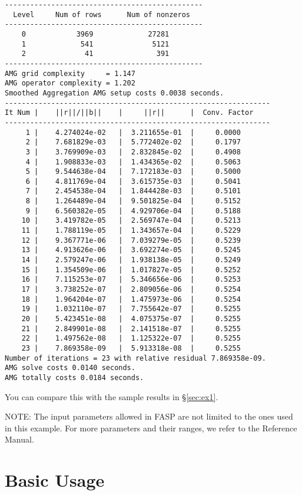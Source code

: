 \documentclass[11pt]{memoir}
\begin{document}
\begin{lstlisting}[numbers=none]
-----------------------------------------------
  Level     Num of rows      Num of nonzeros
-----------------------------------------------
    0            3969             27281
    1             541              5121
    2              41               391
-----------------------------------------------
AMG grid complexity     = 1.147
AMG operator complexity = 1.202
Smoothed Aggregation AMG setup costs 0.0038 seconds.
---------------------------------------------------------------
It Num |    ||r||/||b||    |     ||r||      |  Conv. Factor
---------------------------------------------------------------
     1 |    4.274024e-02   |  3.211655e-01  |     0.0000
     2 |    7.681829e-03   |  5.772402e-02  |     0.1797
     3 |    3.769909e-03   |  2.832845e-02  |     0.4908
     4 |    1.908833e-03   |  1.434365e-02  |     0.5063
     5 |    9.544638e-04   |  7.172183e-03  |     0.5000
     6 |    4.811769e-04   |  3.615735e-03  |     0.5041
     7 |    2.454538e-04   |  1.844428e-03  |     0.5101
     8 |    1.264489e-04   |  9.501825e-04  |     0.5152
     9 |    6.560382e-05   |  4.929706e-04  |     0.5188
    10 |    3.419782e-05   |  2.569747e-04  |     0.5213
    11 |    1.788119e-05   |  1.343657e-04  |     0.5229
    12 |    9.367771e-06   |  7.039279e-05  |     0.5239
    13 |    4.913626e-06   |  3.692274e-05  |     0.5245
    14 |    2.579247e-06   |  1.938138e-05  |     0.5249
    15 |    1.354509e-06   |  1.017827e-05  |     0.5252
    16 |    7.115253e-07   |  5.346656e-06  |     0.5253
    17 |    3.738252e-07   |  2.809056e-06  |     0.5254
    18 |    1.964204e-07   |  1.475973e-06  |     0.5254
    19 |    1.032110e-07   |  7.755642e-07  |     0.5255
    20 |    5.423451e-08   |  4.075375e-07  |     0.5255
    21 |    2.849901e-08   |  2.141518e-07  |     0.5255
    22 |    1.497562e-08   |  1.125322e-07  |     0.5255
    23 |    7.869358e-09   |  5.913318e-08  |     0.5255
Number of iterations = 23 with relative residual 7.869358e-09.
AMG solve costs 0.0140 seconds.
AMG totally costs 0.0184 seconds.
\end{lstlisting}
%
You can compare this with the sample results in \S\ref{sec:ex1}.

\begin{snugshade}\noindent
NOTE: The input parameters allowed in FASP are not limited to the ones used in this example. For more parameters and their ranges, we refer to the Reference Manual.
\end{snugshade}

\chapter{Basic Usage}\label{ch:basic}
\end{document}
